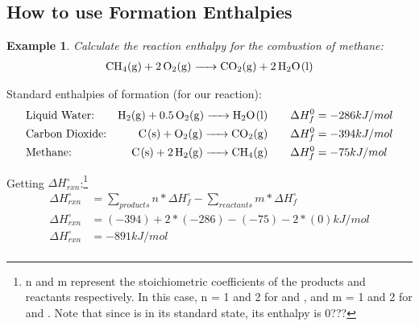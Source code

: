\documentclass{article}  %
\newtheorem{exmp}{Example}
\begin{document}
\subsection*{How to use Formation Enthalpies}
\begin{exmp}
    Calculate the reaction enthalpy for the combustion of methane:
        \begin{equation*}
            \begin{aligned}
                \ce{CH4_(g) + 2 O2_(g) -> CO2_(g) + 2 H2O_(l)}
            \end{aligned}
        \end{equation*}
\end{exmp}
Standard enthalpies of formation (for our reaction):
\begin{equation*}
    \begin{aligned}
        &\text{Liquid Water:} &\ce{H2_(g) + 0.5 O2_(g) -> H2O_(l)} & \quad & \Delta H^0_f &= -286 kJ/mol \\
        &\text{Carbon Dioxide:} &\ce{C_(s) + O2_(g) -> CO2_(g)} & \quad & \Delta H^0_f &= -394 kJ/mol \\
        &\text{Methane:} &\ce{C_(s) + 2 H2_(g) -> CH4_(g)} & \quad & \Delta H^0_f &= -75 kJ/mol \\
    \end{aligned}
\end{equation*}

Getting $\Delta H^\circ_{rxn}$:\footnote{n and m represent the stoichiometric coefficients of the products and reactants respectively. In this case, n = 1 and 2 for  and , and m = 1 and 2 for  and . Note that since  is in its standard state, its enthalpy is 0???}
\begin{equation*}
    \begin{aligned}
        \Delta H^\circ_{rxn} &= \sum_{products} n * \Delta H^\circ_{f} - \sum_{reactants} m * \Delta H^\circ_{f} \\
        \Delta H^\circ_{rxn} &= (-394) + 2*(-286) - (-75) - 2*(0) kJ/mol \\
        \Delta H^\circ_{rxn} &= -891 kJ/mol \\
    \end{aligned}
\end{equation*}
\end{document}
